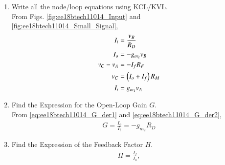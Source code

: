 \begin{enumerate}[label=\thesubsection.\arabic*.,ref=\thesubsection.\theenumi]
%
\item Write all the node/loop equations using KCL/KVL.
\\
\solution From Figs. 	\ref{fig:ee18btech11014_Input} and 	\ref{fig:ee18btech11014_Small_Signal},
%
\begin{align}
\label{eq:ee18btech11014_G_der1}
I_i &= \frac{v_B}{R_D}
\\
\label{eq:ee18btech11014_G_der2}
I_o &= -g_{m_2}v_{B}
\\
\label{eq:ee18btech11014_H_der1}
v_{C} - v_{A} &= -I_fR_F
\\
\label{eq:ee18btech11014_H_der2}
v_C &= \left(I_o + I_f\right)R_M
\\
I_i &= g_{m_1}v_{A}
\label{eq:ee18btech11014_vA}
\end{align}
%

\item Find the Expression for the Open-Loop Gain $G$.
\label{prob:ee18btech11014_G}
\\
\solution From \eqref{eq:ee18btech11014_G_der1} and \eqref{eq:ee18btech11014_G_der2},
%
\begin{align}
\label{eq:ee18btech11014_G}
G=\frac{I_{o}}{I_{i}} = -g_{m_2}R_D
\end{align}

\item Find the Expression of the Feedback Factor $H$.
\\
\solution 
\begin{align}
H = \frac{I_{f}}{I_{o}},
\label{eq:ee18btech11014_Hdef}
\end{align}



\end{enumerate}
